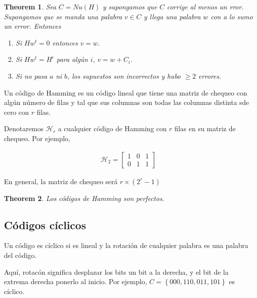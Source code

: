 \documentclass[a4paper]{article}
\newtheorem{theorem}{Theorem}
\newtheorem{theorem}{Theorem}
\begin{document}
\begin{theorem}
    Sea $C = Nu(H)$ y supongamos que $C$ corrige al menos un rror.
    Supongamos que se manda una palabra $v \in C$ y llega una palabra 
    $w$ con a lo sumo un error. Entonces 

    \begin{enumerate}
        \item Si $Hw^t = 0$ entonces $v = w$.
        \item Si $Hw^t = H^i$ para algún $i$, $v = w + C_i$.
        \item Si no pasa $a$ ni $b$, los supuestos son incorrectos y hubo
           $\geq 2$ errores.
    \end{enumerate}
\end{theorem}

\begin{definition}
    Un código de Hamming es un código lineal que tiene una matriz de 
    chequeo con algún número de filas y tal que sus columnas 
    son todas las columnas distinta sde cero con $r$ filas.
\end{definition}

Denotaremos $\mathcal{H}_r$ a cualquier código de Hamming con $r$ filas en su
matriz de chequeo. Por ejemplo,

\begin{align*}
    \mathcal{H}_2 = \begin{bmatrix} 
        1 & 0 & 1 \\ 
        0 & 1 & 1
    \end{bmatrix} 
\end{align*}

En general, la matriz de chequeo será $r \times (2^r - 1)$

\begin{theorem}
    Los códigos de Hamming son perfectos.
\end{theorem}

\subsection{Códigos cíclicos}

\begin{definition}
    Un código es cíclico si es lineal y la rotación de cualquier palabra es una palabra 
    del código.
\end{definition}

Aquí, rotacón significa desplazar los bits un bit a la derecha, y el bit de la extrema 
derecha ponerlo al inicio. Por ejemplo, $C = \left\{ 000, 110, 011, 101 \right\} $ es 
cíclico.
\end{document}
